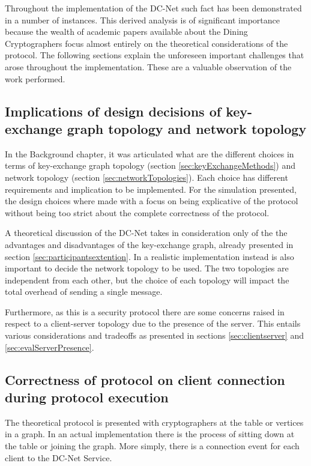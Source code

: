 Throughout the implementation of the DC-Net such fact has been demonstrated in a number of instances. This derived analysis is of significant importance because the wealth of academic papers available about the Dining Cryptographers focus almost entirely on the theoretical considerations of the protocol. The following sections explain the unforeseen important challenges that arose throughout the implementation. These are a valuable observation of the work performed.

\subsection{Implications of design decisions of key-exchange graph topology and network topology}
In the Background chapter, it was articulated what are the different choices in terms of key-exchange graph topology (section \ref{sec:keyExchangeMethods}) and network topology (section \ref{sec:networkTopologies}). Each choice has different requirements and implication to be implemented. For the simulation presented, the design choices where made with a focus on being explicative of the protocol without being too strict about the complete correctness of the protocol.

A theoretical discussion of the DC-Net takes in consideration only of the the advantages and disadvantages of the key-exchange graph, already presented in section \ref{sec:participantsextention}. In a realistic implementation instead is also important to decide the network topology to be used. The two topologies are independent from each other, but the choice of each topology will impact the total overhead of sending a single message.

Furthermore, as this is a security protocol there are some concerns raised in respect to a client-server topology due to the presence of the server. This entails various considerations and tradeoffs as presented in sections \ref{sec:clientserver} and \ref{sec:evalServerPresence}.

\subsection{Correctness of protocol on client connection during protocol execution}
The theoretical protocol is presented with cryptographers at the table or vertices in a graph. In an actual implementation there is the process of sitting down at the table or joining the graph. More simply, there is a connection event for each client to the DC-Net Service. 

